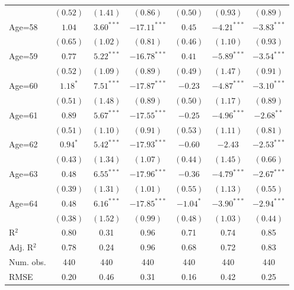 \documentclass[fullpage]{paper}
\begin{document}
\begin{center}
\begin{longtable}{l c c c c c c }
            & $(0.52)$      & $(1.41)$      & $(0.86)$       & $(0.50)$      & $(0.93)$      & $(0.89)$      \\
Age=58      & $1.04$        & $3.60^{***}$  & $-17.11^{***}$ & $0.45$        & $-4.21^{***}$ & $-3.83^{***}$ \\
            & $(0.65)$      & $(1.02)$      & $(0.81)$       & $(0.46)$      & $(1.10)$      & $(0.93)$      \\
Age=59      & $0.77$        & $5.22^{***}$  & $-16.78^{***}$ & $0.41$        & $-5.89^{***}$ & $-3.54^{***}$ \\
            & $(0.52)$      & $(1.09)$      & $(0.89)$       & $(0.49)$      & $(1.47)$      & $(0.91)$      \\
Age=60      & $1.18^{*}$    & $7.51^{***}$  & $-17.87^{***}$ & $-0.23$       & $-4.87^{***}$ & $-3.10^{***}$ \\
            & $(0.51)$      & $(1.48)$      & $(0.89)$       & $(0.50)$      & $(1.17)$      & $(0.89)$      \\
Age=61      & $0.89$        & $5.67^{***}$  & $-17.55^{***}$ & $-0.25$       & $-4.96^{***}$ & $-2.68^{**}$  \\
            & $(0.51)$      & $(1.10)$      & $(0.91)$       & $(0.53)$      & $(1.11)$      & $(0.81)$      \\
Age=62      & $0.94^{*}$    & $5.42^{***}$  & $-17.93^{***}$ & $-0.60$       & $-2.43$       & $-2.53^{***}$ \\
            & $(0.43)$      & $(1.34)$      & $(1.07)$       & $(0.44)$      & $(1.45)$      & $(0.66)$      \\
Age=63      & $0.48$        & $6.55^{***}$  & $-17.96^{***}$ & $-0.36$       & $-4.79^{***}$ & $-2.67^{***}$ \\
            & $(0.39)$      & $(1.31)$      & $(1.01)$       & $(0.55)$      & $(1.13)$      & $(0.55)$      \\
Age=64      & $0.48$        & $6.16^{***}$  & $-17.85^{***}$ & $-1.04^{*}$   & $-3.90^{***}$ & $-2.94^{***}$ \\
            & $(0.38)$      & $(1.52)$      & $(0.99)$       & $(0.48)$      & $(1.03)$      & $(0.44)$      \\
\hline
R$^2$       & 0.80          & 0.31          & 0.96           & 0.71          & 0.74          & 0.85          \\
Adj. R$^2$  & 0.78          & 0.24          & 0.96           & 0.68          & 0.72          & 0.83          \\
Num. obs.   & 440           & 440           & 440            & 440           & 440           & 440           \\
RMSE        & 0.20          & 0.46          & 0.31           & 0.16          & 0.42          & 0.25          \\
\end{longtable}
\end{center}
\end{document}
